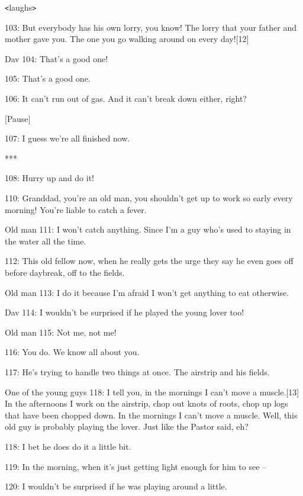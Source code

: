 {\texttt{<}laughs\texttt{>}}

{103: But everybody has his own lorry, you know! The lorry that your father
and mother gave you. The one you go walking around on every day![12]}

{Dav 104: That's a good one! }

{105: That's a good one.}

{106: It can't run out of gas. And it can't break down either, right?}

\begin{center}
{[Pause]}
\end{center}

\leftskip=0pt
{107: I guess we're all finished now.}

\begin{center}
{***}
\end{center}

\leftskip=0pt
{108: Hurry up and do it!}

{110: Granddad, you're an old man, you shouldn't get up to work so early
every morning! You're liable to catch a fever. }

{Old man 111: I won't catch anything. Since I'm a guy who's used to staying
in the water all the time.}

{112: This old fellow now, when he really gets the urge they say he even
goes off before daybreak, off to the fields.}

{Old man 113: I do it because I'm afraid I won't get anything to eat otherwise.}

{Dav 114: I wouldn't be surprised if he played the young lover too!}

{Old man 115: Not me, not me!}

{116: You do. We know all about you.}

{117: He's trying to handle two things at once. The airstrip and his fields.
}

{One of the young guys 118: I tell you, in the mornings I can't move a muscle.[13]
In the afternoons I work on the airstrip, chop out knots of roots, chop up logs
that have been chopped down. In the mornings I can't move a muscle. Well, this
old guy is probably playing the lover. Just like the Pastor said, eh?}

{118: I bet he does do it a little bit.}

{119: In the morning, when it's just getting light enough for him to see
--}

{120: I wouldn't be surprised if he was playing around a little.}

